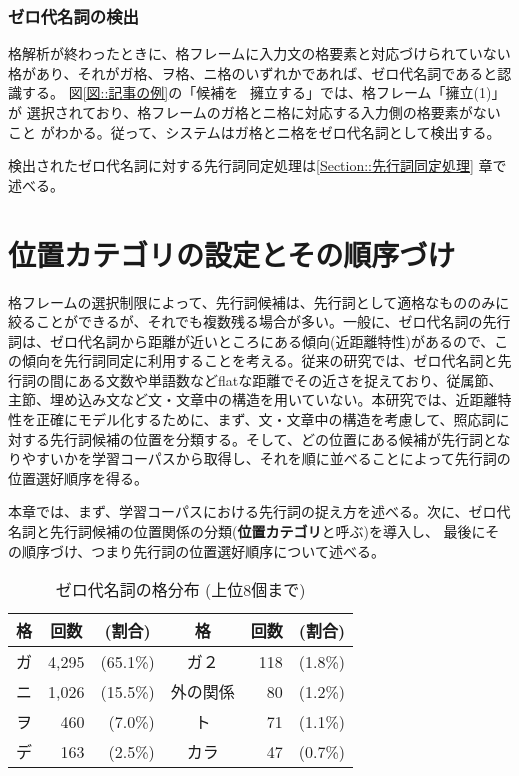\documentclass{nlp}
\begin{document}
\subsubsection{ゼロ代名詞の検出}

格解析が終わったときに、格フレームに入力文の格要素と対応づけられていない
格があり、それがガ格、ヲ格、ニ格のいずれかであれば、ゼロ代名詞であると認
識する。
図\ref{図::記事の例}の「候補を \ 擁立する」では、格フレーム「擁立(1)」が
選択されており、格フレームのガ格とニ格に対応する入力側の格要素がないこと
がわかる。従って、システムはガ格とニ格をゼロ代名詞として検出する。

検出されたゼロ代名詞に対する先行詞同定処理は\ref{Section::先行詞同定処理}
章で述べる。


\section{位置カテゴリの設定とその順序づけ}

格フレームの選択制限によって、先行詞候補は、先行詞として適格なもののみに
絞ることができるが、それでも複数残る場合が多い。一般に、ゼロ代名詞の先行
詞は、ゼロ代名詞から距離が近いところにある傾向(近距離特性)があるので、こ
の傾向を先行詞同定に利用することを考える。従来の研究では、ゼロ代名詞と先
行詞の間にある文数や単語数などflatな距離でその近さを捉えており、従属節、
主節、埋め込み文など文・文章中の構造を用いていない。本研究では、近距離特
性を正確にモデル化するために、まず、文・文章中の構造を考慮して、照応詞に
対する先行詞候補の位置を分類する。そして、どの位置にある候補が先行詞とな
りやすいかを学習コーパスから取得し、それを順に並べることによって先行詞の
位置選好順序を得る。

本章では、まず、学習コーパスにおける先行詞の捉え方を述べる。次に、ゼロ代
名詞と先行詞候補の位置関係の分類(\textbf{位置カテゴリ}と呼ぶ)を導入し、
最後にその順序づけ、つまり先行詞の位置選好順序について述べる。


\begin{table}[t]
 \begin{center}
  \caption{ゼロ代名詞の格分布 (上位8個まで)}
  \label{Table::格分布}
  \begin{tabular}{c|r@{ }r||c|r@{ }r}\hline
   格 & \multicolumn{1}{c}{回数} & \multicolumn{1}{c||}{(割合)} & 格 &
   回数 & \multicolumn{1}{c}{(割合)} \\ \hline
   ガ & 4,295 & (65.1\%) & ガ２ & 118 & (1.8\%) \\
   ニ & 1,026 & (15.5\%) & 外の関係 & 80 & (1.2\%) \\
   ヲ &   460 &  (7.0\%) & ト & 71 & (1.1\%) \\
   デ &   163 &  (2.5\%) & カラ & 47 & (0.7\%) \\ \hline
  \end{tabular}
 \end{center}
\end{table}
\end{document}
